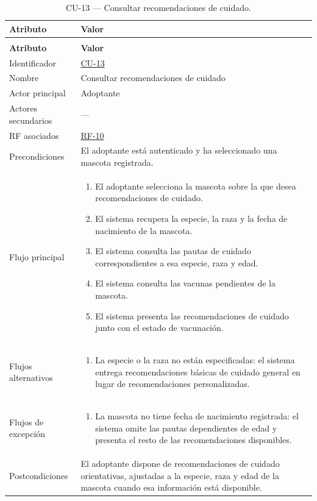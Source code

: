 \documentclass[journal,onecolumn]{IEEEtran}
\makeatletter
\newenvironment{atributos}[2]{%
	\small
	\begin{longtable}{@{}>{\raggedright\arraybackslash}p{4.2cm} >{\raggedright\arraybackslash}p{11.2cm}@{}}
		\caption{#2}\label{tab:#1}\\
		\toprule
		\textbf{Atributo} & \textbf{Valor} \\
		\midrule
		\endfirsthead
		\multicolumn{2}{@{}l}{\small\itshape (continuación)}\\
		\toprule
		\textbf{Atributo} & \textbf{Valor} \\
		\midrule
		\endhead
		\bottomrule
		\endlastfoot
	}{%
	\end{longtable}
	\normalsize
}
\makeatother
\begin{document}
	\begin{atributos}{CU-13}{CU-13 --- Consultar recomendaciones de cuidado.}
		Identificador & \hyperref[tab:CU-13]{CU-13} \\
		Nombre & Consultar recomendaciones de cuidado \\
		Actor principal & Adoptante \\
		Actores secundarios & --- \\
		RF asociados & \hyperref[tab:RF-10]{RF-10} \\
		Precondiciones & El adoptante está autenticado y ha seleccionado una mascota registrada. \\
		Flujo principal &
		\begin{enumerate}[leftmargin=*, nosep]
			\item El adoptante selecciona la mascota sobre la que desea recomendaciones de cuidado.
			\item El sistema recupera la especie, la raza y la fecha de nacimiento de la mascota.
			\item El sistema consulta las pautas de cuidado correspondientes a esa especie, raza y edad.
			\item El sistema consulta las vacunas pendientes de la mascota.
			\item El sistema presenta las recomendaciones de cuidado junto con el estado de vacunación.
		\end{enumerate} \\
		Flujos alternativos &
		\begin{enumerate}[leftmargin=*, nosep]
			\item[3.1] La especie o la raza no están especificadas: el sistema entrega recomendaciones básicas de cuidado general en lugar de recomendaciones personalizadas.
		\end{enumerate} \\
		Flujos de excepción &
		\begin{enumerate}[leftmargin=*, nosep]
			\item[2.1] La mascota no tiene fecha de nacimiento registrada: el sistema omite las pautas dependientes de edad y presenta el resto de las recomendaciones disponibles.
		\end{enumerate} \\
		Postcondiciones & El adoptante dispone de recomendaciones de cuidado orientativas, ajustadas a la especie, raza y edad de la mascota cuando esa información está disponible. \\
	\end{atributos}
	
\end{document}
